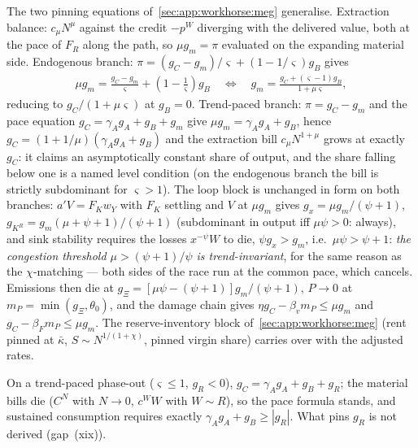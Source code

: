  The two pinning equations of~\ref{sec:app:workhorse:meg}
generalise. Extraction balance: $c_\mu N^{\mu}$ against the credit $-p^W$ diverging with the
delivered value, both at the pace of $F_R$ along the path, so
$\mu g_m=\pi$ evaluated on the expanding material side. Endogenous branch:
$\pi=\left(g_C-g_m\right)/\varsigma+\left(1-1/\varsigma\right)g_B$ gives
\begin{align}
\mu g_m=\frac{g_C-g_m}{\varsigma}+\left(1-\frac{1}{\varsigma}\right)g_B
\quad\Longleftrightarrow\quad
g_m=\frac{g_C+\left(\varsigma-1\right)g_B}{1+\mu\varsigma},
\label{eq:app:wh:trend-meg-endog}
\end{align}
reducing to $g_C/\left(1+\mu\varsigma\right)$ at $g_B=0$. Trend-paced branch:
$\pi=g_C-g_m$ and the pace equation $g_C=\gamma_Ag_A+g_B+g_m$ give
$\mu g_m=\gamma_Ag_A+g_B$, hence $g_C=\left(1+1/\mu\right)\left(\gamma_Ag_A+g_B\right)$
and the extraction bill $c_\mu N^{1+\mu}$ grows at exactly $g_C$: it claims an
asymptotically constant share of output, and the share falling below one is a named level
condition (on the endogenous branch the bill is strictly subdominant for $\varsigma>1$).
The loop block is unchanged in form on both branches: $a'V=F_Kw_Y$ with $F_K$ settling and
$V$ at $\mu g_m$ gives $g_x=\mu g_m/\left(\psi+1\right)$,
$g_{K^R}=g_m\left(\mu+\psi+1\right)/\left(\psi+1\right)$ (subdominant in output iff
$\mu\psi>0$: always), and sink stability requires the losses $x^{-\psi}W$ to die,
$\psi g_x>g_m$, i.e.\ $\mu\psi>\psi+1$: \emph{the congestion threshold
$\mu>\left(\psi+1\right)/\psi$ is trend-invariant}, for the same reason as the
$\chi$-matching --- both sides of the race run at the common pace, which cancels. Emissions
then die at $g_\Xi=\left[\mu\psi-\left(\psi+1\right)\right]g_m/\left(\psi+1\right)$,
$P\to0$ at $m_P=\min\left(g_\Xi,\theta_0\right)$, and the damage chain gives
$\eta g_C-\beta_vm_P\le\mu g_m$ and $g_C-\beta_Fm_P\le\mu g_m$. The reserve-inventory
block of~\ref{sec:app:workhorse:meg} (rent pinned at $\bar\kappa$,
$S\sim N^{1/\left(1+\chi\right)}$, pinned virgin share) carries over with the adjusted
rates.

 On a trend-paced phase-out
($\varsigma\le1$, $g_R<0$), $g_C=\gamma_Ag_A+g_B+g_R$; the material bills die ($C^N$ with
$N\to0$, $c^WW$ with $W\sim R$), so the pace formula stands, and sustained consumption
requires exactly $\gamma_Ag_A+g_B\ge\left|g_R\right|$. What pins $g_R$ is not derived
(gap~(xix)).
